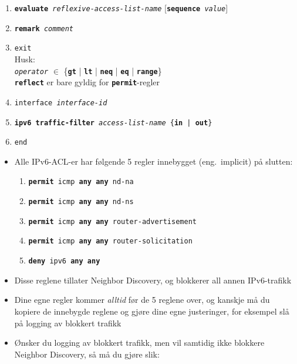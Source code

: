 \begin{frame}[allowframebreaks]
\begin{enumerate}
  \item \texttt{\textbf{evaluate} \textit{reflexive-access-list-name}}
    [\texttt{\textbf{sequence}~\textit{value}}]
  \item \texttt{\textbf{remark} \textit{comment}}
  \item \texttt{exit}\\
    Husk:\\
    \texttt{\textit{operator}} $\in$ \{\texttt{\textbf{gt}} |
    \texttt{\textbf{lt}} | \texttt{\textbf{neq}} |
    \texttt{\textbf{eq}} | \texttt{\textbf{range}}\}\\
    \texttt{\textbf{reflect}} er bare gyldig for \texttt{\textbf{permit}}-regler
  \framebreak
  \item \texttt{interface \textit{interface-id}}
  \item \texttt{\textbf{ipv6 traffic-filter} \textit{access-list-name} \{\textbf{in} | \textbf{out}\}}
  \item \texttt{end}
  \end{enumerate}
  \framebreak
  \begin{itemize}%
  \item Alle IPv6-ACL-er har følgende 5 regler innebygget
    (eng.~implicit) på slutten:
    \begin{enumerate}%
    \item \texttt{\textbf{permit} icmp \textbf{any} \textbf{any} nd-na}
    \item \texttt{\textbf{permit} icmp \textbf{any} \textbf{any} nd-ns}
    \item \texttt{\textbf{permit} icmp \textbf{any} \textbf{any} router-advertisement}
    \item \texttt{\textbf{permit} icmp \textbf{any} \textbf{any} router-solicitation}
    \item \texttt{\textbf{deny\phantom{it}} ipv6 \textbf{any} \textbf{any}}
    \end{enumerate}
  \item Disse reglene tillater Neighbor Discovery, og blokkerer all
    annen IPv6-trafikk
  \item Dine egne regler kommer \textit{alltid\/} før de 5 reglene
    over, og kanskje må du kopiere de innebygde reglene og gjøre dine
    egne justeringer, for eksempel slå på logging av blokkert trafikk
  \framebreak
  \item Ønsker du logging av blokkert trafikk, men vil samtidig ikke
    blokkere Neighbor Discovery, så må du gjøre slik:
    \begin{enumerate}

\end{enumerate}
\end{itemize}
\end{frame}
